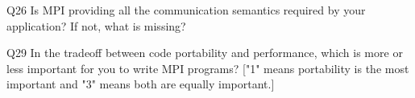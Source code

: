 \begin{description}%
\item{Q26} Is MPI providing all the communication semantics required by your application? If not, what is missing?%
\item{Q29} In the tradeoff between code portability and performance, which is more or less important for you to write MPI programs? ["1" means portability is the most important and "3" means both are equally important.]%
\end{description}%
